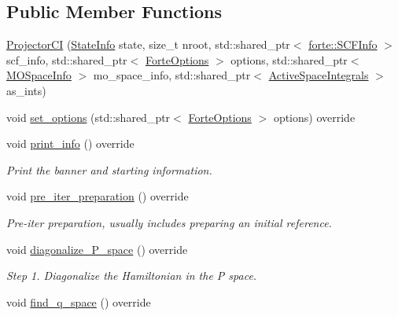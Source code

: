 \subsection*{Public Member Functions}
\begin{DoxyCompactItemize}
\item 
\mbox{\hyperlink{classforte_1_1_projector_c_i_a478bdd78ee2686f927839e726b38de52}{Projector\+CI}} (\mbox{\hyperlink{classforte_1_1_state_info}{State\+Info}} state, size\+\_\+t nroot, std\+::shared\+\_\+ptr$<$ \mbox{\hyperlink{classforte_1_1_s_c_f_info}{forte\+::\+S\+C\+F\+Info}} $>$ scf\+\_\+info, std\+::shared\+\_\+ptr$<$ \mbox{\hyperlink{classforte_1_1_forte_options}{Forte\+Options}} $>$ options, std\+::shared\+\_\+ptr$<$ \mbox{\hyperlink{classforte_1_1_m_o_space_info}{M\+O\+Space\+Info}} $>$ mo\+\_\+space\+\_\+info, std\+::shared\+\_\+ptr$<$ \mbox{\hyperlink{classforte_1_1_active_space_integrals}{Active\+Space\+Integrals}} $>$ as\+\_\+ints)
\item 
void \mbox{\hyperlink{classforte_1_1_projector_c_i_af6605360f58baeccb1877dedcb2ff866}{set\+\_\+options}} (std\+::shared\+\_\+ptr$<$ \mbox{\hyperlink{classforte_1_1_forte_options}{Forte\+Options}} $>$ options) override
\item 
void \mbox{\hyperlink{classforte_1_1_projector_c_i_a9ef4c662c6582ba4ec1a9ab9bd806b6e}{print\+\_\+info}} () override
\begin{DoxyCompactList}\small\item\em Print the banner and starting information. \end{DoxyCompactList}\item 
void \mbox{\hyperlink{classforte_1_1_projector_c_i_a40fddd83a1450b2553f8347f82affca7}{pre\+\_\+iter\+\_\+preparation}} () override
\begin{DoxyCompactList}\small\item\em Pre-\/iter preparation, usually includes preparing an initial reference. \end{DoxyCompactList}\item 
void \mbox{\hyperlink{classforte_1_1_projector_c_i_a2fc4f3f5094af2886237188e33f0f8ec}{diagonalize\+\_\+\+P\+\_\+space}} () override
\begin{DoxyCompactList}\small\item\em Step 1. Diagonalize the Hamiltonian in the P space. \end{DoxyCompactList}\item 
void \mbox{\hyperlink{classforte_1_1_projector_c_i_a8818efb18539867d404b98e13b0a7390}{find\+\_\+q\+\_\+space}} () override

\end{DoxyCompactItemize}
